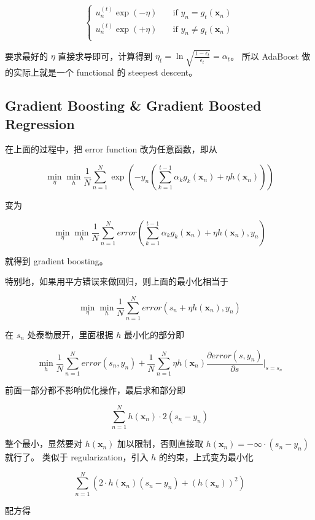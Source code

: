 \documentclass[a4paper]{article}
\begin{document}
$$
\begin{cases}
  u_n^{(t)}\exp(-\eta) & \quad \text{if } y_n = g_t(\mathbf{x}_n) \\
  u_n^{(t)}\exp(+\eta) & \quad \text{if } y_n \ne g_t(\mathbf{x}_n) \\
\end{cases}
$$

要求最好的 $\eta$ 直接求导即可，计算得到 $\eta_t = \ln{\sqrt{\frac{1-\epsilon_t}{\epsilon_t}}} = \alpha_t$。
所以 AdaBoost 做的实际上就是一个 functional 的 steepest descent。

\subsection{Gradient Boosting \& Gradient Boosted Regression}
在上面的过程中，把 error function 改为任意函数，即从

$$\operatorname*{min}_{\eta} \operatorname*{min}_{h} \frac{1}{N}\sum_{n=1}^{N} \exp\left (-y_n \left (\sum_{k=1}^{t-1}\alpha_k g_k(\mathbf{x}_n) + \eta h(\mathbf{x}_n) \right ) \right )$$

变为

$$\operatorname*{min}_{\eta} \operatorname*{min}_{h} \frac{1}{N}\sum_{n=1}^{N} error \left ( \sum_{k=1}^{t-1}\alpha_k g_k(\mathbf{x}_n) + \eta h(\mathbf{x}_n), y_n \right )$$

就得到 gradient boosting。

特别地，如果用平方错误来做回归，则上面的最小化相当于

$$\operatorname*{min}_{\eta} \operatorname*{min}_{h} \frac{1}{N}\sum_{n=1}^{N} error \left ( s_n + \eta h(\mathbf{x}_n), y_n \right )$$

在 $s_n$ 处泰勒展开，里面根据 $h$ 最小化的部分即

$$\operatorname*{min}_{h} \frac{1}{N}\sum_{n=1}^{N}error(s_n, y_n) + \frac{1}{N}\sum_{n=1}^{N}\eta h(\mathbf{x}_n)\frac{\partial error(s, y_n)}{\partial s}|_{s=s_n}$$

前面一部分都不影响优化操作，最后求和部分即

$$\sum_{n=1}^{N}h(\mathbf{x}_n) \cdot 2(s_n - y_n)$$

整个最小，显然要对 $h(\mathbf{x}_n)$ 加以限制，否则直接取 $h(\mathbf{x}_n) = -\infty \cdot (s_n - y_n)$ 就行了。
类似于 regularization，引入 $h$ 的约束，上式变为最小化

$$\sum_{n=1}^{N} \left ( 2 \cdot h(\mathbf{x}_n) (s_n - y_n) + (h(\mathbf{x}_n))^2 \right )$$

配方得
\end{document}
